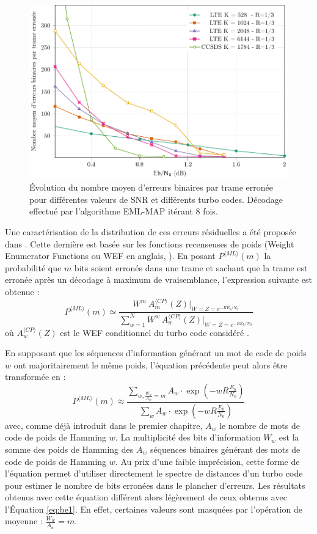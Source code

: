 \begin{figure}[!b]
	\centering
	\includegraphics[width=.8\textwidth]{main/ch3_fig/be/tikz/befe.pdf}
	\caption{Évolution du nombre moyen d'erreurs binaires par trame erronée pour différentes valeurs de SNR et différents
	turbo codes. Décodage effectué par l'algorithme EML-MAP itérant 8 fois. \label{fig:befe}}
\end{figure}

Une caractérisation de la distribution de ces erreurs 
résiduelles a été proposée dans \cite{residual_errors}. Cette dernière est basée sur les fonctions recenseuses de poids
(Weight Enumerator Functions ou WEF en anglais, \cite{ryan}). En posant $P^{\langle ML\rangle}(m)$ la probabilité que 
$m$ bits soient erronés dans une trame et sachant que la trame est erronée après un décodage à maximum de vraisemblance,
l'expression suivante est obtenue :
\begin{equation}
P^{\langle ML\rangle}(m) \simeq \frac{W^m~A_m^{\langle CP\rangle}(Z)\vert_{W=Z=e^{-RE_b/N_0}}}{\sum\limits_{w=1}^N W^w~A_w^{\langle CP\rangle}(Z) \vert_{W=Z=e^{-RE_b/N_0}}}
\label{eq:be1}
\end{equation}
où $A_w^{\langle CP\rangle}(Z)$ est le WEF conditionnel du turbo code considéré \cite{benedetto_unveiling}.

En supposant que les séquences d'information 
générant un mot de code de poids $w$ ont majoritairement le même poids, l'équation précédente peut alors être transformée 
en : 
\begin{equation}
P^{\langle ML\rangle}(m) \approx \frac{\displaystyle\sum\limits_{w, \frac{W_w}{A_w}=m} A_w\cdot \exp\left(-w R \frac{E_b}{N_0}\right)}
                  {\displaystyle\sum\limits_{w} A_w\cdot \exp\left(-w R \frac{E_b}{N_0}\right)}
\label{eq:be2}
\end{equation}
avec, comme déjà introduit dans le premier chapitre, $A_w$ le nombre de mots de code de poids de Hamming $w$. La 
multiplicité des bits d'information $W_w$ est la somme des poids de Hamming des $A_w$ séquences binaires générant des
mots de code de poids de Hamming $w$. Au prix d'une faible imprécision, cette forme de l'équation permet d'utiliser 
directement le spectre de distances d'un turbo code pour estimer le nombre de bits erronées dans le plancher d'erreurs. Les
résultats obtenus avec cette équation différent alors légèrement de ceux obtenus avec l'Équation \ref{eq:be1}. En effet,
certaines valeurs sont masquées par l'opération de moyenne : $\frac{W_w}{A_w}=m$. 


